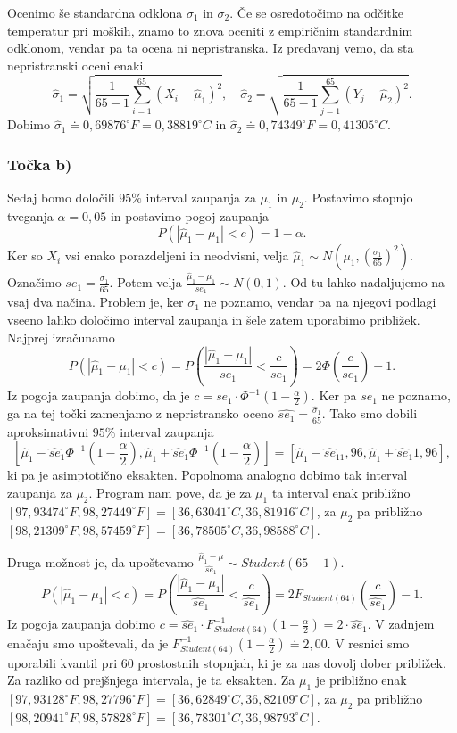 \documentclass[12pt, letterpaper]{article}
\begin{document}
Ocenimo še standardna odklona $\sigma_1$ in $\sigma_2$. Če se osredotočimo na odčitke temperatur pri moških, znamo to znova oceniti z empiričnim standardnim odklonom, vendar pa ta ocena ni nepristranska. Iz predavanj vemo, da sta nepristranski oceni enaki
\[
\hat{\sigma}_1 = \sqrt{\frac{1}{65-1}\sum_{i=1}^{65}(X_i - \hat{\mu}_1)^2}, \quad \hat{\sigma}_2 = \sqrt{\frac{1}{65-1}\sum_{j=1}^{65}(Y_j - \hat{\mu}_2)^2}.
\]
Dobimo $\hat{\sigma}_1 \doteq 0,69876^{\circ}F = 0,38819^{\circ}C$ in $\hat{\sigma}_2 \doteq 0,74349^{\circ}F = 0,41305^{\circ}C$.
\subsubsection*{Točka b)} Sedaj bomo določili $95\%$ interval zaupanja za $\mu_1$ in $\mu_2$. Postavimo stopnjo tveganja $\alpha = 0,05$ in postavimo pogoj zaupanja
\[
P(|\hat{\mu}_1 - \mu_1| < c) = 1 - \alpha.
\]
Ker so $X_i$ vsi enako porazdeljeni in neodvisni, velja $\hat{\mu}_1 \sim N(\mu_1, (\frac{\sigma_1}{65})^2)$. Označimo $se_1 = \frac{\sigma_1}{65}$. Potem velja $\frac{\hat{\mu}_1 - \mu_1}{se_1} \sim N(0,1)$. Od tu lahko nadaljujemo na vsaj dva načina. Problem je, ker $\sigma_1$ ne poznamo, vendar pa na njegovi podlagi vseeno lahko določimo interval zaupanja in šele zatem uporabimo približek. Najprej izračunamo
\[
P(|\hat{\mu}_1 - \mu_1| < c) = P\left(\frac{|\hat{\mu}_1 - \mu_1|}{se_1} < \frac{c}{se_1}\right) = 2\Phi\left(\frac{c}{se_1}\right) - 1.
\]
Iz pogoja zaupanja dobimo, da je $c = se_1\cdot\Phi^{-1}(1 - \frac{\alpha}{2})$. Ker pa $se_1$ ne poznamo, ga na tej točki zamenjamo z nepristransko oceno $\hat{se_1} = \frac{\hat{\sigma}_1}{65}$.
Tako smo dobili aproksimativni $95\%$ interval zaupanja
\[\left[\hat{\mu}_1 - \hat{se}_1\Phi^{-1}\left(1 - \frac{\alpha}{2}\right),  \hat{\mu}_1 + \hat{se}_1\Phi^{-1}\left(1 - \frac{\alpha}{2}\right)\right] = \left[\hat{\mu}_1 - \hat{se}_11,96,  \hat{\mu}_1 + \hat{se}_1 1,96\right],\]
ki pa je asimptotično eksakten. Popolnoma analogno dobimo tak interval zaupanja za $\mu_2$. Program nam pove, da je za $\mu_1$ ta interval enak približno $[97,93474^{\circ}F, 98,27449^{\circ}F] = [36,63041^{\circ}C, 36,81916^{\circ}C]$, za $\mu_2$ pa približno $[98,21309^{\circ}F, 98,57459^{\circ}F] = [36,78505^{\circ}C, 36,98588^{\circ}C]$.

Druga možnost je, da upoštevamo $\frac{\hat{\mu}_1 - \mu}{\hat{se}_1} \sim Student(65-1)$.
\[
P(|\hat{\mu}_1 - \mu_1| < c) = P\left(\frac{|\hat{\mu}_1 - \mu_1|}{\hat{se}_1} < \frac{c}{\hat{se}_1}\right) = 2F_{Student(64)}\left(\frac{c}{\hat{se}_1}\right) - 1.
\]
Iz pogoja zaupanja dobimo $c = \hat{se}_1\cdot F^{-1}_{Student(64)}(1 - \frac{\alpha}{2}) = 2 \cdot\hat{se}_1$. V zadnjem enačaju smo upoštevali, da je $F^{-1}_{Student(64)}(1 - \frac{\alpha}{2}) \doteq 2,00$. V resnici smo uporabili kvantil pri $60$ prostostnih stopnjah, ki je za nas dovolj dober približek. Za razliko od prejšnjega intervala, je ta eksakten. Za $\mu_1$ je približno enak $[97,93128^{\circ}F, 98,27796^{\circ}F] = [36,62849^{\circ}C, 36,82109^{\circ}C]$, za $\mu_2$ pa približno $[98,20941^{\circ}F, 98,57828^{\circ}F] =[36,78301^{\circ}C, 36,98793^{\circ}C]$.
\end{document}
